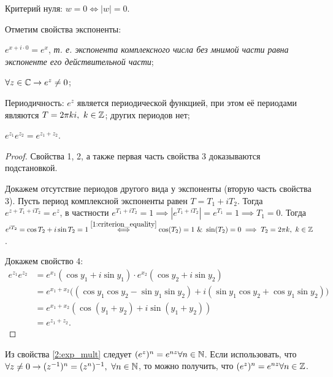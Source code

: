 \begin{note}\label{2:criterion_zero}
Критерий нуля: \(w = 0 \iff |w| = 0\).
\end{note}

Отметим свойства экспоненты:
\begin{properties}
\item \(e^{x+i\cdot 0} = e^x\), \textit{т. е. экспонента комплексного числа без мнимой части равна
    экспоненте его действительной части};
\item \label{2:exp_neq_0}\(\forall z \in \mathbb{C} \rightarrow e^z \neq 0\);
\item Периодичность: \(e^z\) является периодической функцией, при этом её периодами являются \(T =
    2\pi k i, \ k\in \mathbb{Z}\); других периодов нет;
\item \label{2:exp_mult} \(e^{z_1} e^{z_2} = e^{z_1 + z_2}\).
\end{properties}

\begin{proof}
Свойства 1, 2, а также первая часть свойства 3 доказываются подстановкой.

Докажем отсутствие периодов другого вида у экспоненты (вторую часть свойства 3). Пусть период
комплексной экспоненты равен \(T = T_1 + i T_2\). Тогда \(e^{z + T_1 + i T_2} = e^z\), в частности
\(e^{T_1 + i T_2} = 1 \implies |e^{T_1 + i T_2}| = e^{T_1} = 1 \implies T_1 = 0\). Тогда \(e^{iT_2}
= \cos{T_2} + i \sin{T_2} = 1 \overset{\ref{1:criterion_equality}}{\iff} \cos(T_2) = 1 \ \& \
\sin(T_2) = 0 \implies T_2 = 2 \pi k, \ k \in \mathbb{Z}\).

Докажем свойство 4:
\begin{align*}
    e^{z_1} e^{z_2}
    &= e^{x_1}(\cos y_1 + i\sin y_1) \cdot e^{x_2}(\cos y_2 + i\sin y_2) \\
    &= e^{x_1 + x_2} \Big( (\cos y_1 \cos y_2 - \sin y_1 \sin y_2) + i(\sin y_1 \cos y_2 + \cos y_1
        \sin y_2) \Big) \\
    &= e^{x_1 + x_2} (\cos(y_1 + y_2) + i\sin(y_1 + y_2)) \\
    &= e^{z_1 + z_2}.
\end{align*}
\end{proof}

\begin{corollary}
Из свойства \ref{2:exp_mult} следует \((e^z)^n = e^{nz} \forall n \in \mathbb{N}\). Если использовать, что
\(\forall z \neq 0 \rightarrow (z^{-1})^n = (z^n)^{-1}, \  \forall n \in \mathbb{N}\), то можно получить,
что \((e^z)^n = e^{nz} \forall n \in \mathbb{Z}\).
\end{corollary}

